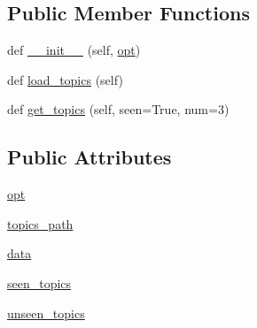 \subsection*{Public Member Functions}
\begin{DoxyCompactItemize}
\item 
def \hyperlink{classprojects_1_1wizard__of__wikipedia_1_1mturk__evaluation__task_1_1worlds_1_1TopicsGenerator_ab0591d0cf65c47ce1341247bd0c79d36}{\+\_\+\+\_\+init\+\_\+\+\_\+} (self, \hyperlink{classprojects_1_1wizard__of__wikipedia_1_1mturk__evaluation__task_1_1worlds_1_1TopicsGenerator_a069f85cf871b5e326575e94730872786}{opt})
\item 
def \hyperlink{classprojects_1_1wizard__of__wikipedia_1_1mturk__evaluation__task_1_1worlds_1_1TopicsGenerator_a19eb72588e1025eb43d8c24ea9b91593}{load\+\_\+topics} (self)
\item 
def \hyperlink{classprojects_1_1wizard__of__wikipedia_1_1mturk__evaluation__task_1_1worlds_1_1TopicsGenerator_ad4b8871760a65ea4685005b013d6e372}{get\+\_\+topics} (self, seen=True, num=3)
\end{DoxyCompactItemize}
\subsection*{Public Attributes}
\begin{DoxyCompactItemize}
\item 
\hyperlink{classprojects_1_1wizard__of__wikipedia_1_1mturk__evaluation__task_1_1worlds_1_1TopicsGenerator_a069f85cf871b5e326575e94730872786}{opt}
\item 
\hyperlink{classprojects_1_1wizard__of__wikipedia_1_1mturk__evaluation__task_1_1worlds_1_1TopicsGenerator_a573fa066c488ab3a4251408c85cef7f7}{topics\+\_\+path}
\item 
\hyperlink{classprojects_1_1wizard__of__wikipedia_1_1mturk__evaluation__task_1_1worlds_1_1TopicsGenerator_a55a55c6d796feb5538175f71511ef009}{data}
\item 
\hyperlink{classprojects_1_1wizard__of__wikipedia_1_1mturk__evaluation__task_1_1worlds_1_1TopicsGenerator_aa6face03045e7bcc82847b93d6e2b2f0}{seen\+\_\+topics}
\item 
\hyperlink{classprojects_1_1wizard__of__wikipedia_1_1mturk__evaluation__task_1_1worlds_1_1TopicsGenerator_a1c81736776ac55ce8fc2b5bd72a58e78}{unseen\+\_\+topics}
\end{DoxyCompactItemize}


